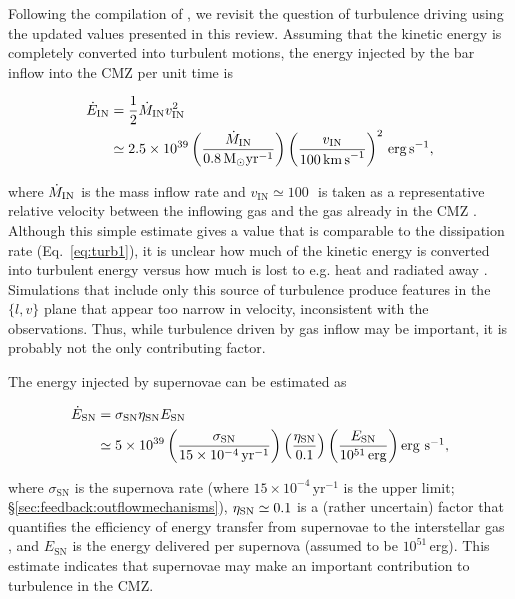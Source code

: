 Following the compilation of \citet[][and \citealp{MacLow2004}]{Kruijssen2014a}, we revisit the question of turbulence driving using the updated values presented in this review. 
Assuming that the kinetic energy is completely converted into turbulent motions, the energy injected by the bar inflow into the CMZ per unit time is

\setlength{\mathindent}{0pt}
\begin{footnotesize}
\begin{align}
    \dot{E}_\mathrm{IN} & =\frac{1}{2}\dot{M}_{\rm IN} v_{\rm IN}^2 \nonumber \\
    & \simeq 2.5\times 10^{39}\left(\frac{\dot{M}_{\rm IN}}{0.8\,\mathrm{M}_\odot\mathrm{yr}^{-1}}\right)\left(\frac{v_\mathrm{IN}}{100\,\mathrm{km\,s}^{-1}}\right)^{2}\, \mathrm{erg\,s^{-1}},
\end{align}

\end{footnotesize}
% 
where $\dot{M}_{\rm IN}$ is the mass inflow rate and $v_\mathrm{IN}\simeq100$\,\kms \ is taken as a representative relative velocity between the inflowing gas and the gas already in the CMZ \citep[e.g.][]{Sormani2019b}. Although this simple estimate gives a value that is comparable to the dissipation rate (Eq.~\ref{eq:turb1}), it is unclear how much of the kinetic energy is converted into turbulent energy versus how much is lost to e.g. heat and radiated away \citep{Klessen2010}. Simulations that include only this source of turbulence \citep[e.g.][]{Sormani2019a} produce features in the $\{l,v\}$ plane that appear too narrow in velocity, inconsistent with the observations.
Thus, while turbulence driven by gas inflow may be important, it is probably not the only contributing factor.

The energy injected by supernovae can be estimated as

\setlength{\mathindent}{0pt}
\begin{footnotesize}

\begin{align}
    \dot{E}_{\rm SN} & =\sigma_\mathrm{SN}\eta_\mathrm{SN}E_\mathrm{SN} \nonumber \\
    & \simeq 5\times10^{39} \left( \frac{\sigma_\mathrm{SN}}{15\times10^{-4}\,\mathrm{yr}^{-1}} \right)\left( \frac{\eta_{\rm SN}}{0.1} \right)\left( \frac{E_\mathrm{SN}}{10^{51}\,\mathrm{erg}} \right)\mbox{${\rm erg}~{\rm s}^{-1}$},
\end{align}

\end{footnotesize}
%
where $\sigma_\mathrm{SN}$ is the supernova rate (where $15\times10^{-4}\,\mathrm{yr}^{-1}$ is the upper limit; \S\ref{sec:feedback:outflowmechanisms}), $\eta_{\rm SN} \simeq 0.1$ is a (rather uncertain) factor that quantifies the efficiency of energy transfer from supernovae to the interstellar gas \citep{MacLow2004}, and $E_\mathrm{SN}$ is the energy delivered per supernova (assumed to be $10^{51}$\,erg). This estimate indicates that supernovae may make an important contribution to turbulence in the CMZ.

